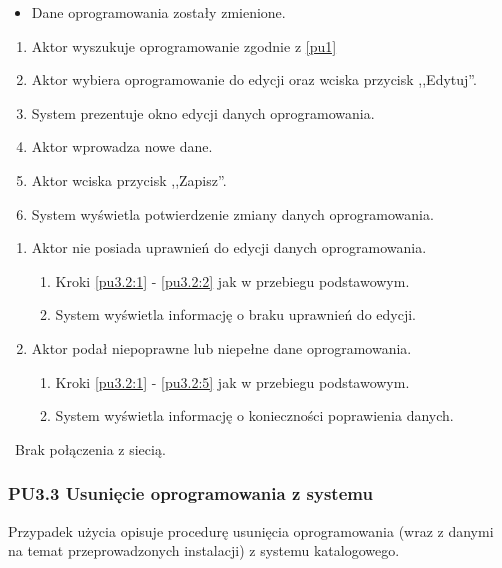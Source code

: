 \begin{itemize}
\item Dane oprogramowania zostały zmienione.
\end{itemize}

\begin{enumerate}
\item \label{pu3.2:1} Aktor wyszukuje oprogramowanie zgodnie z \ref{pu1}
\item \label{pu3.2:2} Aktor wybiera oprogramowanie do edycji oraz wciska przycisk ,,Edytuj''.
\item System prezentuje okno edycji danych oprogramowania.
\item Aktor wprowadza nowe dane.
\item \label{pu3.2:5} Aktor wciska przycisk ,,Zapisz''.
\item System wyświetla potwierdzenie zmiany danych oprogramowania.
\end{enumerate}

\begin{enumerate}
\item Aktor nie posiada uprawnień do edycji danych oprogramowania.
	\begin{enumerate}[label*=\arabic*.]
		\item Kroki \ref{pu3.2:1} - \ref{pu3.2:2} jak w przebiegu podstawowym.
		\item System wyświetla informację o braku uprawnień do edycji.
	\end{enumerate}
\item Aktor podał niepoprawne lub niepełne dane oprogramowania.
	\begin{enumerate}[label*=\arabic*.]
		\item Kroki \ref{pu3.2:1} - \ref{pu3.2:5} jak w przebiegu podstawowym.
		\item System wyświetla informację o konieczności poprawienia danych.
	\end{enumerate}
\end{enumerate}

\
Brak połączenia z siecią.

\subsubsection{PU3.3 Usunięcie oprogramowania z systemu}

Przypadek użycia opisuje procedurę usunięcia oprogramowania (wraz z danymi na temat przeprowadzonych instalacji) z systemu katalogowego.

